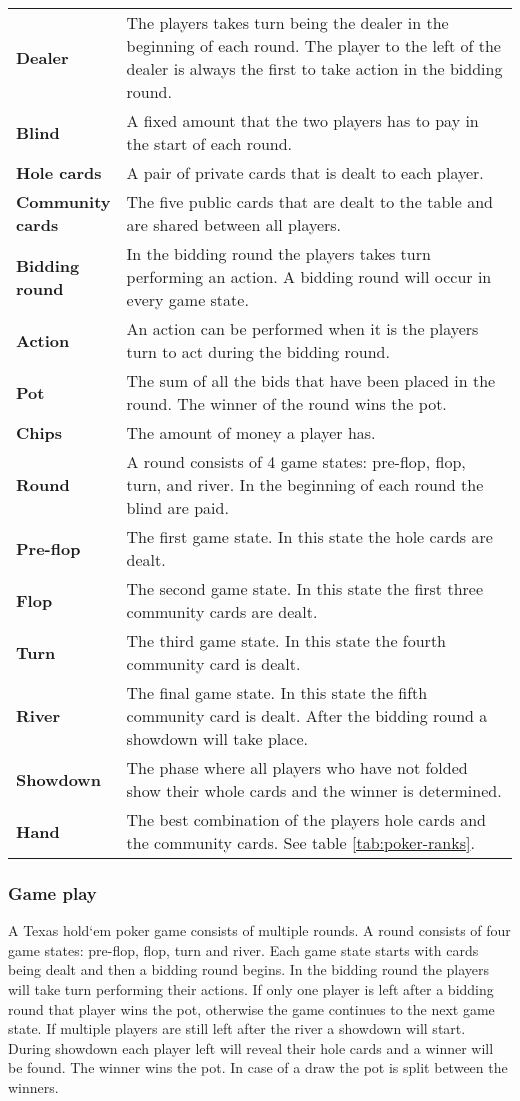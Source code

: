 \begin{tabular}{ p{0.18\linewidth} p{0.82\linewidth} }
\textbf{Dealer} & The players takes turn being the dealer in the beginning of each round. The player to the left of the dealer is always the first to take action in the bidding round.\\
\textbf{Blind} & A fixed amount that the two players has to pay in the start of each round.\\
\textbf{Hole cards} & A pair of private cards that is dealt to each player. \\
\textbf{Community cards} & The five public cards that are dealt to the table and are shared between all players.\\
\textbf{Bidding round} & In the bidding round the players takes turn performing an action. A bidding round will occur in every game state.\\
\textbf{Action} & An action can be performed when it is the players turn to act during the bidding round.\\
\textbf{Pot} & The sum of all the bids that have been placed in the round. The winner of the round wins the pot.\\
\textbf{Chips} & The amount of money a player has.\\
\textbf{Round} & A round consists of 4 game states: pre-flop, flop, turn, and river. In the beginning of each round the blind are paid.\\
\textbf{Pre-flop} & The first game state. In this state the hole cards are dealt.\\
\textbf{Flop} & The second game state. In this state the first three community cards are dealt.\\
\textbf{Turn} & The third game state. In this state the fourth community card is dealt.\\
\textbf{River} & The final game state. In this state the fifth community card is dealt. After the bidding round a showdown will take place.\\
\textbf{Showdown} & The phase where all players who have not folded show their whole cards and the winner is determined.\\
\textbf{Hand} & The best combination of the players hole cards and the community cards. See table \ref{tab:poker-ranks}.
\end{tabular}

\subsubsection*{Game play}
A Texas hold`em poker game consists of multiple rounds. A round consists of four game states: pre-flop, flop, turn and river. Each game state starts with cards being dealt and then a bidding round begins. In the bidding round the players will take turn performing their actions. If only one player is left after a bidding round that player wins the pot, otherwise the game continues to the next game state. If multiple players are still left after the river a showdown will start. During showdown each player left will reveal their hole cards and a winner will be found. The winner wins the pot. In case of a draw the pot is split between the winners.

